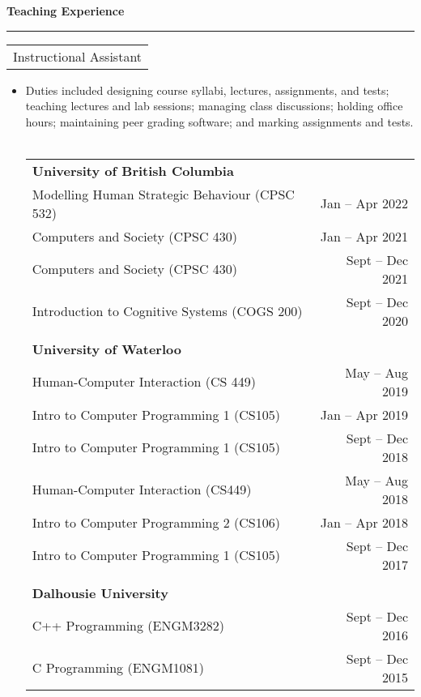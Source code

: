 \documentclass{article}
\newcommand{\heading}[1]
{
	\vspace{3pt}
	{\bf #1} 
	\vspace{-6pt}
	
	\rule{\linewidth}{0.4pt}
}
\begin{document}
\clearpage

\heading{Teaching Experience}
\begin{tabularx}{\textwidth}{X}
	Instructional Assistant
\end{tabularx}
\begin{itemize}
	\item Duties included designing course syllabi, lectures, assignments, and tests; teaching lectures and lab sessions; managing class discussions; holding office hours; maintaining peer grading software; and marking assignments and tests. \\~\\
	\begin{tabularx}{\linewidth}{Xr}
		\textbf{University of British Columbia}	\\
		Modelling Human Strategic Behaviour (CPSC 532) & Jan -- Apr 2022 \\
		Computers and Society (CPSC 430) & Jan -- Apr 2021 \\
		Computers and Society (CPSC 430) & Sept -- Dec 2021 \\
		Introduction to Cognitive Systems (COGS 200) & Sept -- Dec 2020 \\
		\\
		\textbf{University of Waterloo}	\\
		Human-Computer Interaction (CS 449) & May -- Aug 2019 \\
		Intro to Computer Programming 1 (CS105) & Jan -- Apr 2019 \\
		Intro to Computer Programming 1 (CS105) & Sept -- Dec 2018 \\
		Human-Computer Interaction (CS449) & May -- Aug 2018 \\
		Intro to Computer Programming 2 (CS106) & Jan -- Apr 2018 \\
		Intro to Computer Programming 1 (CS105) & Sept -- Dec 2017 \\
		\\
		\textbf{Dalhousie University}	\\
		C++ Programming (ENGM3282) & Sept -- Dec 2016 \\ 
		C Programming (ENGM1081) & Sept -- Dec 2015 \\
	\end{tabularx} ~\\
\end{itemize}
\end{document}
